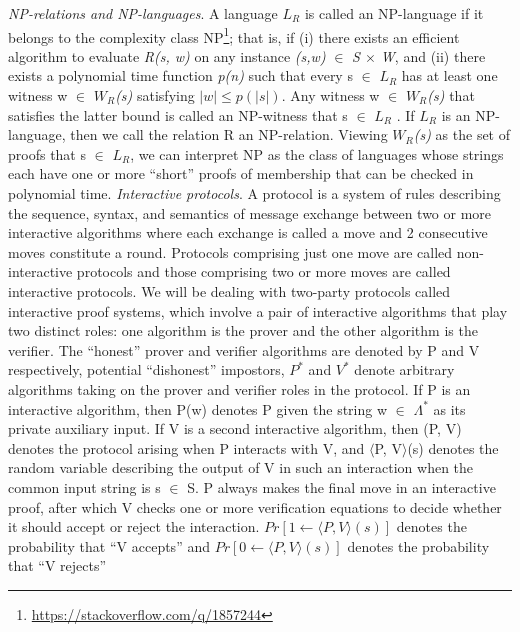 \documentclass[a4paper]{article}
\newcommand{\quotes}[1]{``#1''}
\begin{document}
\newline
\textit{NP-relations and NP-languages}. A language \textit{$L_R$} is called an NP-language if it belongs to the complexity class NP\footnote{\url{https://stackoverflow.com/q/1857244}}; that is, if (i) there exists an efficient algorithm to evaluate \textit{R(s, w)} on any instance \textit{(s,w)} $\in$ \textit{S $\times$ W}, and (ii) there exists a polynomial time function \emph{p(n)} such that every s $\in$ \textit{$L_R$} has at least one witness w $\in$ \textit{$W_R$(s)} satisfying $|w|\leq p(|s|)$.
Any witness w $\in$ \textit{$W_R$(s)} that satisfies the latter bound is called an NP-witness that s $\in$ \textit{$L_R$} . If \textit{$L_R$} is an NP-language, then we call the relation R an NP-relation. Viewing \textit{$W_R$(s)} as the set of proofs that s $\in$ \textit{$L_R$}, we can interpret NP as the class of languages whose strings each have one or more \quotes{short} proofs of membership that can be checked in polynomial time.
\newline
\newline
\textit{Interactive protocols}. A protocol is a system of rules describing the sequence, syntax, and semantics of message exchange between two or more interactive algorithms where each exchange is called a move and 2 consecutive moves constitute a round. Protocols comprising just one move are called non-interactive protocols and those comprising two or more moves are called interactive protocols. We will be dealing with two-party protocols called interactive proof systems, which involve a pair of interactive algorithms that play two distinct roles: one algorithm is the prover and the other algorithm is the verifier. The \quotes{honest} prover and verifier algorithms are denoted by P and V respectively, potential \quotes{dishonest} impostors, \textit{$P^{*}$} and \textit{$V^{*}$} denote arbitrary algorithms taking on the prover and verifier roles in the protocol. If P is an interactive algorithm, then P(w) denotes P given the string w $\in$ \(\Lambda^{*}\) as its private auxiliary input. If V is a second interactive algorithm, then (P, V) denotes the protocol arising when P interacts with V, and $\langle$P, V$\rangle$(s) denotes the random variable describing the output of V in such an interaction when the common input string is s $\in$ S. P always makes the final move in an interactive proof, after which V checks one or more verification equations to decide whether it should accept or reject the interaction. $Pr[1 \gets \langle P, V \rangle (s)]$ denotes the probability that \quotes{V accepts} and $Pr[0 \gets \langle P, V \rangle (s)]$ denotes the probability that \quotes{V rejects}
\end{document}

